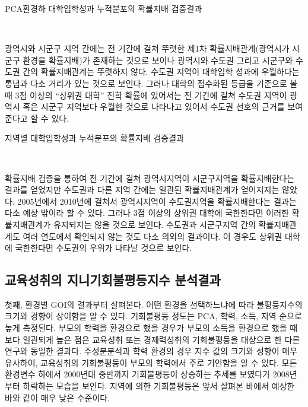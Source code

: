 \begin{table}[htbp]
    \centering
    \caption{PCA환경하 대학입학성과 누적분포의 확률지배 검증결과}
    
    \\
    \label{tab:goms_dom_bypca}
\end{table}

광역시와 시군구 지역 간에는 전 기간에 걸쳐 뚜렷한 제1차 확률지배관계(광역시가 시군구 환경을 확률지배)가 존재하는 것으로 보이나 광역시와 수도권 그리고 시군구와 수도권 간의 확률지배관계는 뚜렷하지 않다.
 수도권 지역이 대학입학 성과에 우월하다는 통념과 다소 거리가 있는 것으로 보인다.
 그러나 대학의 점수화된 등급을 기준으로 볼 때 3점 이상의 ``상위권 대학'' 진학 확률에 있어서는 전 기간에 걸쳐 수도권 지역이 광역시 혹은 시군구 지역보다 우월한 것으로 나타나고 있어서 수도권 선호의 근거를 보여준다고 할 수 있다.  

\begin{table}[htbp]
    \centering
    \caption{지역별 대학입학성과 누적분포의 확률지배 검증결과}
    
    \\
    \label{tab:goms_dom_byrgn}
\end{table}

 확률지배 검증을 통하여 전 기간에 걸쳐 광역시지역이 시군구지역을 확률지배한다는 결과를 얻었지만 수도권과 다른 지역 간에는 일관된 확률지배관계가 얻어지지는 않았다.
 2005년에서 2010년에 걸쳐서 광역시지역이 수도권지역을 확률지배한다는 결과는 다소 예상 밖이라 할 수 있다.
  그러나 3점 이상의 상위권 대학에 국한한다면 이러한 확률지배관계가 유지되지는 않을 것으로 보인다.
  수도권과 시군구지역 간의 확률지배관계도 여러 연도에서 확인되지 않는 것도 다소 의외의 결과이다.
  이 경우도 상위권 대학에 국한한다면 수도권의 우위가 나타날 것으로 보인다. 


\subsection{교육성취의 지니기회불평등지수 분석결과}

첫째, 환경별 GOI의 결과부터 살펴본다.
어떤 환경을 선택하느냐에 따라 불평등지수의 크기와 경향이 상이함을 알 수 있다.
 기회불평등 정도는 PCA, 학력, 소득, 지역 순으로 높게 측정된다.
 부모의 학력을 환경으로 했을 경우가 부모의 소득을 환경으로 했을 때보다 일관되게 높은 점은 교육성취 또는 경제력성취의 기회불평등을 대상으로 한 다른 연구와 동일한 결과다.
 주성분분석과 학력 환경의 경우 지수 값의 크기와 성향이 매우 유사하여, 교육성취의 기회불평등이 부모의 학력에서 주로 기인함을 알 수 있다.
 모든 환경변수 하에서 2000년대 중반까지 기회불평등이 상승하는 추세를 보였다가 2008년부터 하락하는 모습을 보인다.
 지역에 의한 기회불평등은 앞서 살펴본 바에서 예상한 바와 같이 매우 낮은 수준이다.

